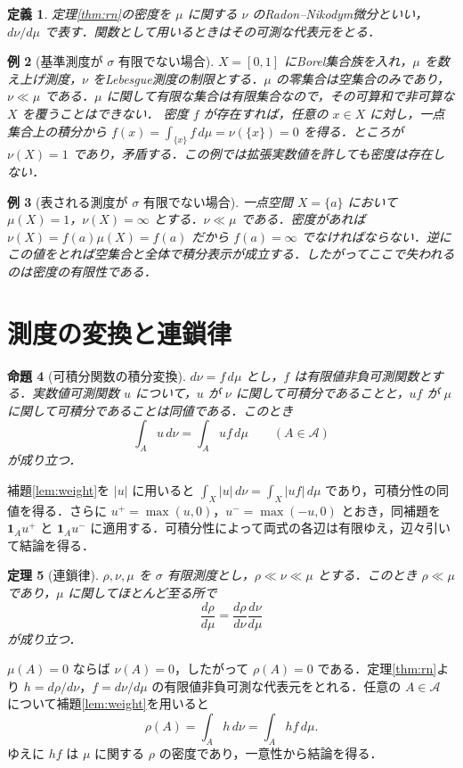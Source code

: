 \documentclass[a5paper,10pt,onecolumn]{jsarticle}
\makeatletter
\theoremstyle{mathnotetheorem}
\newtheorem{theorem}{定理}[section]
\newtheorem{definition}[theorem]{定義}
\newtheorem{proposition}[theorem]{命題}
\newtheorem{example}[theorem]{例}
\renewcommand{\proofname}{証明}
\renewenvironment{proof}[1][\proofname]{%
  \par\pushQED{\qed}\normalfont\topsep4\p@\@plus2\p@\relax
  \trivlist\item[\hskip\labelsep\bfseries #1]\ignorespaces
}{\popQED\endtrivlist\@endpefalse}
\makeatother
\begin{document}
\begin{definition}
定理\ref{thm:rn}の密度を $\mu$ に関する $\nu$ のRadon--Nikodym微分といい，$d\nu/d\mu$ で表す．関数として用いるときはその可測な代表元をとる．
\end{definition}

\begin{example}[基準測度が $\sigma$ 有限でない場合]
$X=[0,1]$ にBorel集合族を入れ，$\mu$ を数え上げ測度，$\nu$ をLebesgue測度の制限とする．$\mu$ の零集合は空集合のみであり，$\nu\ll\mu$ である．$\mu$ に関して有限な集合は有限集合なので，その可算和で非可算な $X$ を覆うことはできない．
密度 $f$ が存在すれば，任意の $x\in X$ に対し，一点集合上の積分から
$f(x)=\int_{\{x\}}f\,d\mu=\nu(\{x\})=0$ を得る．ところが $\nu(X)=1$ であり，矛盾する．この例では拡張実数値を許しても密度は存在しない．
\end{example}

\begin{example}[表される測度が $\sigma$ 有限でない場合]
一点空間 $X=\{a\}$ において $\mu(X)=1$，$\nu(X)=\infty$ とする．$\nu\ll\mu$ である．密度があれば $\nu(X)=f(a)\mu(X)=f(a)$ だから $f(a)=\infty$ でなければならない．逆にこの値をとれば空集合と全体で積分表示が成立する．したがってここで失われるのは密度の有限性である．
\end{example}

\section{測度の変換と連鎖律}

\begin{proposition}[可積分関数の積分変換]\label{prop:change}
$d\nu=f\,d\mu$ とし，$f$ は有限値非負可測関数とする．実数値可測関数 $u$ について，$u$ が $\nu$ に関して可積分であることと，$uf$ が $\mu$ に関して可積分であることは同値である．このとき
\[
                 \int_A u\,d\nu=\int_A uf\,d\mu
                 \qquad(A\in\mathcal A)
\]
が成り立つ．
\end{proposition}
\begin{proof}
補題\ref{lem:weight}を $|u|$ に用いると $\int_X |u|\,d\nu=\int_X|uf|\,d\mu$ であり，可積分性の同値を得る．さらに $u^+=\max(u,0)$，$u^-=\max(-u,0)$ とおき，同補題を $\mathbf1_Au^+$ と $\mathbf1_Au^-$ に適用する．可積分性によって両式の各辺は有限ゆえ，辺々引いて結論を得る．
\end{proof}

\begin{theorem}[連鎖律]
$\rho,\nu,\mu$ を $\sigma$ 有限測度とし，$\rho\ll\nu\ll\mu$ とする．このとき $\rho\ll\mu$ であり，$\mu$ に関してほとんど至る所で
\[
            \frac{d\rho}{d\mu}=
            \frac{d\rho}{d\nu}\frac{d\nu}{d\mu}
\]
が成り立つ．
\end{theorem}
\begin{proof}
$\mu(A)=0$ ならば $\nu(A)=0$，したがって $\rho(A)=0$ である．定理\ref{thm:rn}より $h=d\rho/d\nu$，$f=d\nu/d\mu$ の有限値非負可測な代表元をとれる．任意の $A\in\mathcal A$ について補題\ref{lem:weight}を用いると
\[
       \rho(A)=\int_A h\,d\nu=\int_A hf\,d\mu .
\]
ゆえに $hf$ は $\mu$ に関する $\rho$ の密度であり，一意性から結論を得る．
\end{proof}
\end{document}
